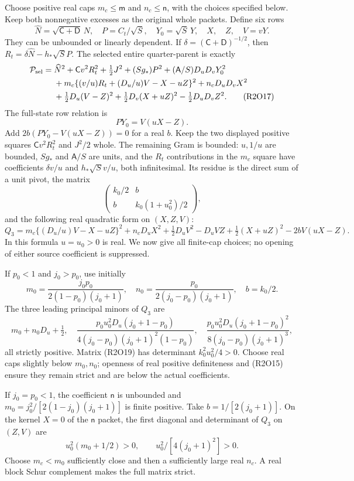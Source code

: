 Choose positive real caps $m_c\leq\mathsf m$ and
$n_c\leq\mathsf n$, with the choices specified below.  Keep both
nonnegative excesses as the original whole packets.  Define six rows
\[
\widehat N=\sqrt{\mathsf C+\mathsf D}\,N,\quad
P=C_t/\sqrt S,\quad Y_0=\sqrt S\,Y,
\quad X,\quad Z,\quad V=vY.
\tag{R2O16}
\]
They can be unbounded or linearly dependent.  If
$\delta=(\mathsf C+\mathsf D)^{-1/2}$, then
$R_t=\delta\widehat N-h_*\sqrt S P$.  The selected entire
quarter-parent is exactly
\begin{align*}
\mathcal P_{\rm sel}={}&\widehat N^2+\mathsf C v^2R_t^2
 +\tfrac12J^2+(Sg_*)P^2
 +(\mathsf A/S)D_uD_vY_0^2\\
&+m_c\{(v/u)R_t+(D_u/u)V-X-uZ\}^2
 +n_cD_uD_vX^2\\
&+\tfrac12D_u(V-Z)^2+\tfrac12D_v(X+uZ)^2
 -\tfrac12D_uD_vZ^2.
\tag{R2O17}
\end{align*}
The full-state row relation is
\[
PY_0=V(uX-Z).
\tag{R2O18}
\]
Add $2b(PY_0-V(uX-Z))=0$ for a real $b$.  Keep the two displayed
positive squares $\mathsf C v^2R_t^2$ and $J^2/2$ whole.  The
remaining Gram is bounded: $u,1/u$ are bounded, $Sg_*$ and
$\mathsf A/S$ are units, and the $R_t$ contributions in the
$m_c$ square have coefficients $\delta v/u$ and
$h_*\sqrt S v/u$, both infinitesimal.  Its residue is the direct sum
of a unit pivot, the matrix
\[
\begin{pmatrix}k_0/2&b\\b&k_0(1+u_0^2)/2\end{pmatrix},
\tag{R2O19}
\]
and the following real quadratic form on $(X,Z,V)$:
\[
Q_3=m_c\{(D_u/u)V-X-uZ\}^2+n_cD_uX^2
 +\tfrac12D_uV^2-D_uVZ+\tfrac12(X+uZ)^2
 -2bV(uX-Z).
\tag{R2O20}
\]
In this formula $u=u_0>0$ is real.  We now give all finite-cap choices;
no opening of either source coefficient is suppressed.

If $p_0<1$ and $j_0>p_0$, use initially
\[
m_0=\frac{j_0p_0}{2(1-p_0)(j_0+1)},\quad
n_0=\frac{p_0}{2(j_0-p_0)(j_0+1)},\quad b=k_0/2.
\]
The three leading principal minors of $Q_3$ are
\[
m_0+n_0D_u+\tfrac12,\quad
\frac{p_0u_0^2D_u(j_0+1-p_0)}
 {4(j_0-p_0)(j_0+1)^2(1-p_0)},\quad
\frac{p_0u_0^2D_u(j_0+1-p_0)^2}
 {8(j_0-p_0)(j_0+1)^3},
\tag{R2O21}
\]
all strictly positive.  Matrix (R2O19) has determinant
$k_0^2u_0^2/4>0$.  Choose real caps slightly below $m_0,n_0$;
openness of real positive definiteness and (R2O15) ensure they remain
strict and are below the actual coefficients.

If $j_0=p_0<1$, the coefficient $\mathsf n$ is unbounded and
$m_0=j_0^2/[2(1-j_0)(j_0+1)]$ is finite positive.  Take
$b=1/[2(j_0+1)]$.  On the kernel $X=0$ of the $\mathsf n$ packet,
the first diagonal and determinant of $Q_3$ on $(Z,V)$ are
\[
u_0^2(m_0+1/2)>0,\qquad
u_0^2/[4(j_0+1)^2]>0.
\tag{R2O22}
\]
Choose $m_c<m_0$ sufficiently close and then a sufficiently large
real $n_c$.  A real block Schur complement makes the full matrix strict.

